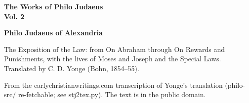 \documentclass[11pt,letterpaper]{article}
\begin{document}
\color{ink}

\begin{titlepage}
\centering
\vspace*{4em}
{\LARGE\bfseries\color{heading} The Works of Philo Judaeus\\[0.3em]Vol. 2\par}
\vspace{2em}
{\Large\bfseries\color{heading} Philo Judaeus of Alexandria\par}
\vspace{2.5em}
{\itshape\color{subhead}\parbox{0.8\linewidth}{\centering The Exposition of the Law: from On Abraham through On Rewards and Punishments, with the lives of Moses and Joseph and the Special Laws. Translated by C. D. Yonge (Bohn, 1854--55).\par}}
\vfill
{\small From the earlychristianwritings.com transcription of Yonge's translation (philo-src/ re-fetchable; see stj2tex.py). The text is in the public domain.\par}
\vspace{2em}
\end{titlepage}

\tableofcontents


\end{document}
